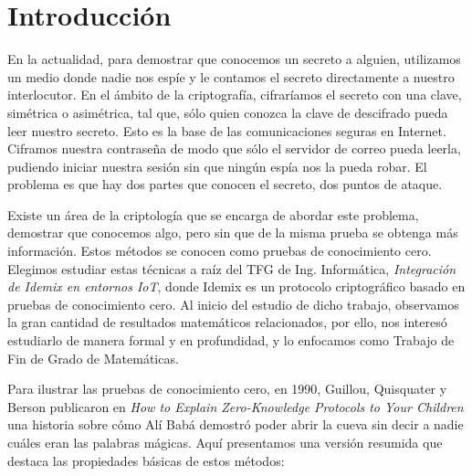 \chapter{Introducción}\label{ch:introduction}

En la actualidad, para demostrar que conocemos un secreto a alguien, utilizamos un medio donde nadie nos espíe y le contamos el secreto directamente a nuestro interlocutor. En el ámbito de la criptografía, cifraríamos el secreto con una clave, simétrica o asimétrica, tal que, sólo quien conozca la clave de descifrado pueda leer nuestro secreto. Esto es la base de las comunicaciones seguras en Internet. Ciframos nuestra contraseña de modo que sólo el servidor de correo pueda leerla, pudiendo iniciar nuestra sesión sin que ningún espía nos la pueda robar. El problema es que hay dos partes que conocen el secreto, dos puntos de ataque.

Existe un área de la criptología que se encarga de abordar este problema, demostrar que conocemos algo, pero sin que de la misma prueba se obtenga más información. Estos métodos se conocen como pruebas de conocimiento cero. Elegimos estudiar estas técnicas a raíz del TFG de Ing. Informática, \textit{Integración de Idemix en entornos IoT}, donde Idemix es un protocolo criptográfico basado en pruebas de conocimiento cero. Al inicio del estudio de dicho trabajo, observamos la gran cantidad de resultados matemáticos relacionados, por ello, nos interesó estudiarlo de manera formal y en profundidad, y lo enfocamos como Trabajo de Fin de Grado de Matemáticas.

Para ilustrar las pruebas de conocimiento cero, en 1990, Guillou, Quisquater y Berson publicaron en \textit{How to Explain Zero-Knowledge Protocols to Your Children} \citep{ZKPcave:story} una historia sobre cómo Alí Babá demostró poder abrir la cueva sin decir a nadie cuáles eran las palabras mágicas. Aquí presentamos una versión resumida que destaca las propiedades básicas de estos métodos:

\hfil

